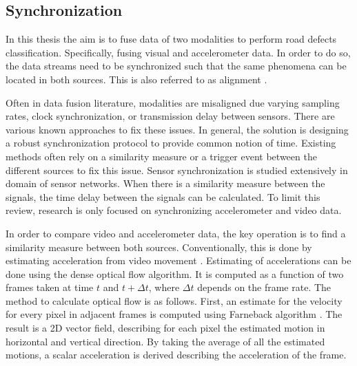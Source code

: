 \subsection{Synchronization}
\label{section:synchronization}

In this thesis the aim is to fuse data of two modalities to perform road defects classification. Specifically, fusing visual and accelerometer data. In order to do so, the data streams need to be synchronized such that the same phenomena can be located in both sources. This is also referred to as alignment \cite{Baltrusaitis2017}.

Often in data fusion literature, modalities are misaligned due varying sampling rates, clock synchronization, or transmission delay between sensors. There are various known approaches to fix these issues. In general, the solution is designing a robust synchronization protocol to provide common notion of time. Existing methods often rely on a similarity measure or a trigger event between the different sources to fix this issue. Sensor synchronization is studied extensively in domain of sensor networks. When there is a similarity measure between the signals, the time delay between the signals can be calculated. To limit this review, research is only focused on synchronizing accelerometer and video data.

In order to compare video and accelerometer data, the key operation is to find a similarity measure between both sources. Conventionally, this is done by estimating acceleration from video movement \cite{Fridman2015,Zhang2020}. Estimating of accelerations can be done using the dense optical flow algorithm. It is computed as a function of two frames taken at time $t$ and $t + \Delta t$, where $\Delta t$ depends on the frame rate. The method to calculate optical flow is as follows. First, an estimate for the velocity for every pixel in adjacent frames is computed using Farneback algorithm \cite{Farnebäck2003}. The result is a 2D vector field, describing for each pixel the estimated motion in horizontal and vertical direction. By taking the average of all the estimated motions, a scalar acceleration is derived describing the acceleration of the frame.

